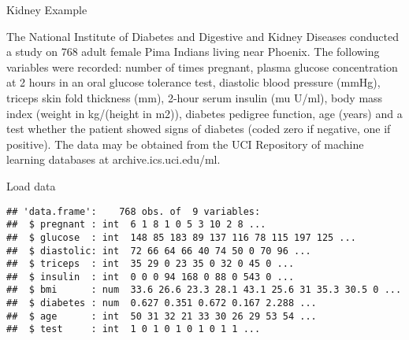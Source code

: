 \begin{frame}{Kidney Example}
\protect\hypertarget{kidney-example}{}

The National Institute of Diabetes and Digestive and Kidney Diseases
conducted a study on 768 adult female Pima Indians living near Phoenix.
The following variables were recorded: number of times pregnant, plasma
glucose concentration at 2 hours in an oral glucose tolerance test,
diastolic blood pressure (mmHg), triceps skin fold thickness (mm),
2-hour serum insulin (mu U/ml), body mass index (weight in kg/(height in
m2)), diabetes pedigree function, age (years) and a test whether the
patient showed signs of diabetes (coded zero if negative, one if
positive). The data may be obtained from the UCI Repository of machine
learning databases at archive.ics.uci.edu/ml.

\end{frame}

\begin{frame}[fragile]{Load data}
\protect\hypertarget{load-data}{}

\begin{Shaded}
\begin{Highlighting}[]
 \NormalTok{)}
\end{Highlighting}
\end{Shaded}

\begin{verbatim}
## 'data.frame':    768 obs. of  9 variables:
##  $ pregnant : int  6 1 8 1 0 5 3 10 2 8 ...
##  $ glucose  : int  148 85 183 89 137 116 78 115 197 125 ...
##  $ diastolic: int  72 66 64 66 40 74 50 0 70 96 ...
##  $ triceps  : int  35 29 0 23 35 0 32 0 45 0 ...
##  $ insulin  : int  0 0 0 94 168 0 88 0 543 0 ...
##  $ bmi      : num  33.6 26.6 23.3 28.1 43.1 25.6 31 35.3 30.5 0 ...
##  $ diabetes : num  0.627 0.351 0.672 0.167 2.288 ...
##  $ age      : int  50 31 32 21 33 30 26 29 53 54 ...
##  $ test     : int  1 0 1 0 1 0 1 0 1 1 ...
\end{verbatim}

\end{frame}

